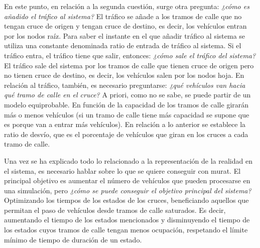 En este punto, en relación a la segunda cuestión, surge otra pregunta: \textit{¿cómo es añadido el tráfico al sistema?} El tráfico se añade a los tramos de calle que no tengan cruce de origen y tengan cruce de destino, es decir, los vehículos entran por los nodos raíz. Para saber el instante en el que añadir tráfico al sistema se utiliza una constante denominada ratio de entrada de tráfico al sistema. Si el tráfico entra, el tráfico tiene que salir, entonces: \textit{¿cómo sale el tráfico del sistema?} El tráfico sale del sistema por los tramos de calle que tienen cruce de origen pero no tienen cruce de destino, es decir, los vehículos salen por los nodos hoja. \newline
En relación al tráfico, también, es necesario preguntarse: \textit{¿qué vehículos van hacia qué tramo de calle en el cruce?} A priori, como no se sabe, se puede partir de un modelo equiprobable. En función de la capacidad de los tramos de calle girarán más o menos vehículos (si un tramo de calle tiene más capacidad se supone que es porque van a entrar más vehículos). En relación a lo anterior se establece la ratio de desvío, que es el porcentaje de vehículos que giran en los cruces a cada tramo de calle.

Una vez se ha explicado todo lo relacionado a la representación de la realidad en el sistema, es necesario hablar sobre lo que se quiere conseguir con \acrshort{murat}. El principal objetivo es aumentar el número de vehículos que pueden procesarse en una simulación, pero \textit{¿cómo se puede conseguir el objetivo principal del sistema?} Optimizando los tiempos de los estados de los cruces, beneficiando aquellos que permitan el paso de vehículos desde tramos de calle saturados. Es decir, aumentando el tiempo de los estados mencionados y disminuyendo el tiempo de los estados cuyos tramos de calle tengan menos ocupación, respetando el límite mínimo de tiempo de duración de un estado.

\newpage
